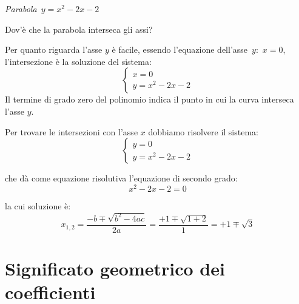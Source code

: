 \begin{minipage}{.40\textwidth}
\begin{center}
 \begin{inaccessibleblock}
  \graficotrinomio
  \emph{Parabola~\(y=x^2-2x-2\)}\label{fig:parabola_trinomio2}
\end{inaccessibleblock}
\end{center}
\end{minipage}
\hfill
\begin{minipage}{.55\textwidth}
Dov'è che la parabola interseca gli assi?

Per quanto riguarda l'asse \(y\) è facile, essendo l'equazione
dell'asse~\(y\):~\(x=0\),
l'intersezione è la soluzione del sistema:
\[\left\{\begin{array}{l}
 x=0 \\
 y=x^2-2x-2
\end{array}\right.\]
Il termine di grado zero del polinomio indica il punto in cui la curva
interseca l'asse \(y\).

Per trovare le intersezioni con l'asse \(x\) dobbiamo risolvere il sistema:
\[\left\{\begin{array}{l}
 y=0 \\
 y=x^2-2x-2
\end{array}\right.\]

che dà come equazione risolutiva l'equazione di secondo grado:
\[x^2-2x-2=0\]

la cui soluzione è:
\[x_{1, 2} = \dfrac{-b \mp\sqrt{b^2-4ac}}{2a}=
             \dfrac{+1 \mp\sqrt{1+2}}{1}=+1 \mp\sqrt{3}\]

\end{minipage}


\section{Significato geometrico dei coefficienti}
\label{sec:parabola_coefficienti}



